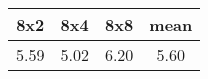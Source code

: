 \begin{tabular}{|c|c|c|c|}
\hline
\textbf{8x2}&\textbf{8x4}&\textbf{8x8}&\textbf{mean}\\\hline
5.59&5.02&6.20&5.60\\\hline
\end{tabular}
